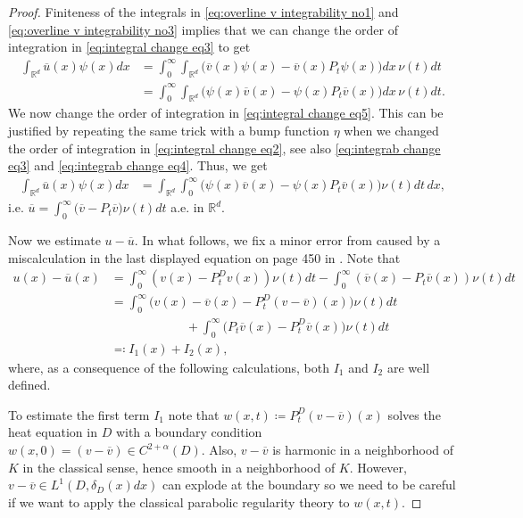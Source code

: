 \documentclass[12pt,a4paper,onecolumn]{amsart}
\theoremstyle{definition}
\newcommand{\R}{\mathbb{R}}
\newcommand{\1}{\mathbf 1}
\newcommand{\LLL}{L^1(D,\de(x)dx)}
\newcommand{\de}{\delta_D}
\numberwithin{equation}{section}
\begin{document}
\begin{proof}
	Finiteness of the integrals in \eqref{eq:overline v integrability no1} and \eqref{eq:overline v integrability no3} implies that we can change the order of integration in \eqref{eq:integral change eq3} to get
	\begin{align}\label{eq:integral change eq5}
		\int_{\R^d}\overline u(x)\psi(x)dx&=\int_0^\infty\int_{\R^d}\big(\overline v(x)\psi(x)-\overline v(x)P_t\psi(x)\big)dx\, \nu(t) dt\nonumber\\
        &=\int_0^\infty\int_{\R^d}\big(\psi(x)\overline v(x)-\psi(x)P_t\overline v(x)\big)dx\, \nu(t)dt.
	\end{align}
	We now change the order of integration in \eqref{eq:integral change eq5}. This can be justified by repeating the same trick with a bump function $\eta$ when we changed the order of integration in \eqref{eq:integral change eq2}, see also \eqref{eq:integrab change eq3} and \eqref{eq:integrab change eq4}. Thus, we get
	\begin{align*}
		\int_{\R^d} 	\overline u(x)\psi(x)dx&=\int_{\R^d}\int_0^\infty\big(\psi(x)\overline v(x)-\psi(x)P_t\overline v(x)\big)\nu(t) dt\,dx,
	\end{align*}
	i.e. $\overline u=\int_{0}^\infty\big(\overline v- P_t\overline v\big)\nu(t)dt$ a.e. in $\R^d$.
	
	Now we estimate $u-\overline u$. In what follows, we fix a minor error from \cite{AbaDupaNonhomo2017} caused by a miscalculation in the last displayed equation on page 450 in \cite{AbaDupaNonhomo2017}. Note that
	\begin{align*}
		u(x)-\overline u(x)&=\int_0^\infty(v(x)-P_t^Dv(x))\nu(t)dt-\int_0^\infty(\overline v(x)-P_t\overline v(x))\nu(t)dt\\
		&=\int_0^\infty\big(v(x)-\overline v(x)-P_t^D(v-\overline v)(x)\big)\nu(t)dt\\&\hspace{6em}+\int_0^\infty\big(P_t\overline v(x)-P_t^D\overline v(x)\big)\nu(t)dt\\
		&\eqqcolon I_1(x)+I_2(x),
	\end{align*}
    where, as a consequence of the following calculations, both $I_1$ and $I_2$ are well defined.
    
    To estimate the first term $I_1$ note that $w(x,t)\coloneqq P_t^D(v-\overline v)(x)$ solves the heat equation in $D$ with a boundary condition $w(x,0)=(v-\overline v)\in C^{2+\alpha}(D)$. Also, $v-\overline v$ is harmonic in a neighborhood of $K$ in the classical sense, hence smooth in a neighborhood of $K$. However, $v-\overline v\in \LLL$ can explode at the boundary so we need to be careful if we want to apply the classical parabolic regularity theory to $w(x,t)$. 
    

\end{proof}
\end{document}
